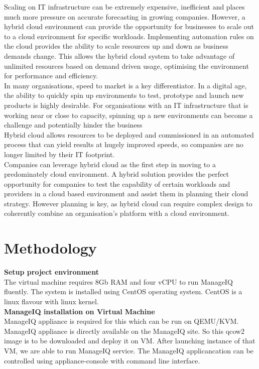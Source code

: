 \documentclass[a4paper,12pt]{report}
\begin{document}
Scaling on IT infrastructure can be extremely expensive, inefficient and places much more pressure on accurate forecasting in growing companies. However, a hybrid cloud environment can provide the opportunity for businesses to scale out to a cloud environment for specific workloads. Implementing automation rules on the cloud provides the ability to scale resources up and down as business demands change. This allows the hybrid cloud system to take advantage of unlimited resources based on demand driven usage, optimising the environment for performance and efficiency.\\

In many organisations, speed to market is a key differentiator. In a digital age, the ability to quickly spin up environments to test, prototype and launch new products is highly desirable. For organisations with an IT infrastructure that is working near or close to capacity, spinning up a new environments can become a challenge and potentially hinder the business\\

Hybrid cloud allows resources to be deployed and commissioned in an automated process that can yield results at hugely improved speeds, so companies are no longer limited by their IT footprint.\\

Companies can leverage hybrid cloud as the first step in moving to a predominately cloud environment. A hybrid solution provides the perfect opportunity for companies to test the capability of certain workloads and providers in a cloud based environment and assist them in planning their cloud strategy. However planning is key, as hybrid cloud can require complex design to coherently combine an organisation’s platform with a cloud environment.

\chapter{Methodology}

\textbf{Setup project environment}\\
The virtual machine requires 8Gb RAM and four vCPU to run ManageIQ fluently. The system is installed using CentOS operating system. CentOS is a linux flavour with linux kernel.\\

\textbf{ManageIQ installation on Virtual Machine}\\
ManageIQ appliance is required for this which can be run on QEMU/KVM. ManageIQ appliance is directly available on the ManageIQ site. So this qcow2 image is to be downloaded and deploy it on VM. After launching instance of that VM, we are able to run ManageIQ service. The ManageIQ applicancation can be controlled using appliance-console with command line interface.\\
\end{document}
